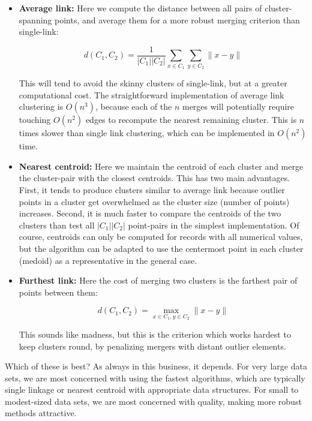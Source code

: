 \documentclass[10pt]{article}
\begin{document}
\begin{itemize}
  \item \textbf{Average link:} Here we compute the distance between all pairs of cluster-spanning points, and average them for a more robust merging criterion than single-link:
  
  \[
  d\left(C_{1}, C_{2}\right)=\frac{1}{\left|C_{1}\right|\left|C_{2}\right|} \sum_{x \in C_{1}} \sum_{y \in C_{2}}\|x-y\|
  \]

  This will tend to avoid the skinny clusters of single-link, but at a greater computational cost. The straightforward implementation of average link clustering is $O(n^{3})$, because each of the $n$ merges will potentially require touching $O(n^{2})$ edges to recompute the nearest remaining cluster. This is $n$ times slower than single link clustering, which can be implemented in $O(n^{2})$ time.
  
  \item \textbf{Nearest centroid:} Here we maintain the centroid of each cluster and merge the cluster-pair with the closest centroids. This has two main advantages. First, it tends to produce clusters similar to average link because outlier points in a cluster get overwhelmed as the cluster size (number of points) increases. Second, it is much faster to compare the centroids of the two clusters than test all $\left|C_{1}\right|\left|C_{2}\right|$ point-pairs in the simplest implementation. Of course, centroids can only be computed for records with all numerical values, but the algorithm can be adapted to use the centermost point in each cluster (medoid) as a representative in the general case.
  
  \item \textbf{Furthest link:} Here the cost of merging two clusters is the farthest pair of points between them:
  
  \[
  d\left(C_{1}, C_{2}\right)=\max _{x \in C_{1}, y \in C_{2}}\|x-y\|
  \]

  This sounds like madness, but this is the criterion which works hardest to keep clusters round, by penalizing mergers with distant outlier elements.
\end{itemize}

Which of these is best? As always in this business, it depends. For very large data sets, we are most concerned with using the fastest algorithms, which are typically single linkage or nearest centroid with appropriate data structures. For small to modest-sized data sets, we are most concerned with quality, making more robust methods attractive.
\end{document}
